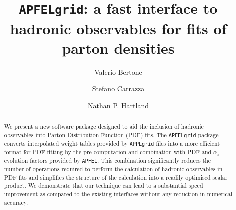\documentclass[preprint,12pt]{elsarticle}
\begin{document}
 
 \begin{frontmatter}



\title{{\tt APFELgrid}: a fast interface to hadronic observables for
  fits of parton densities}


\author[a]{Valerio Bertone}
\author[b]{Stefano Carrazza}
\author[a]{Nathan P. Hartland}

\address[a]{Rudolf Peierls Centre for Theoretical Physics,\\ 1 Keble Road, University of Oxford, OX1 3NP, Oxford, UK}
\address[b]{Theory Department, CERN, CH-1211 Geneva 23, Switzerland}

\begin{abstract}
We present a new software package designed to aid the inclusion of hadronic
observables into Parton Distribution Function (PDF) fits. The {\tt APFELgrid} package
converts interpolated weight tables provided by {\tt APPLgrid} files into a more efficient
format for PDF fitting by the pre-computation and combination with PDF and $\alpha_s$ evolution factors provided
by {\tt APFEL}. This combination significantly reduces the number of operations required to perform the calculation
of hadronic observables in PDF fits and simplifies the structure of the calculation into
a readily optimised scalar product. We demonstrate that our technique
can lead to a substantial speed improvement as compared to the
existing interfaces without any reduction in numerical accuracy.


\end{abstract}
\end{frontmatter}
\end{document}
